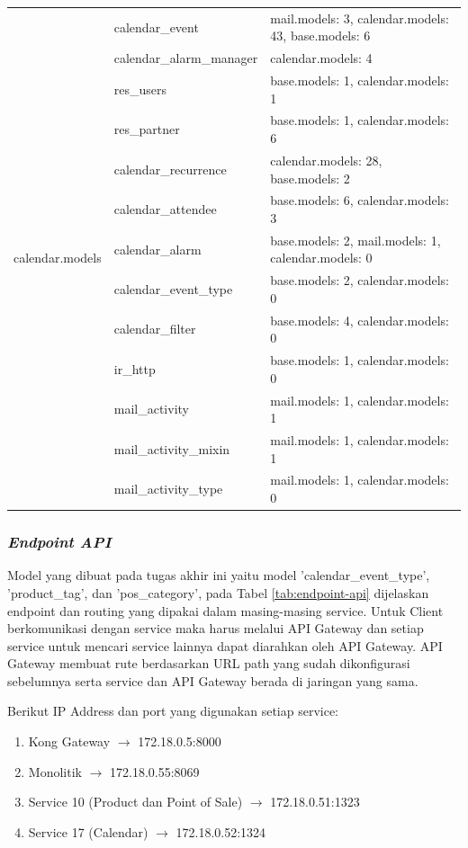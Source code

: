 \begin{longtable}{|c|p{4cm}|p{7cm}|}
	\hline
	\multirow{13}{*}{calendar.models} &  calendar{\_}event &  mail.models: 3, calendar.models: 43, base.models: 6 \\ \cline{2-3}  &  calendar{\_}alarm{\_}manager &  calendar.models: 4 \\ \cline{2-3}  &  res{\_}users &  base.models: 1, calendar.models: 1 \\ \cline{2-3}  &  res{\_}partner &  base.models: 1, calendar.models: 6 \\ \cline{2-3}  &  calendar{\_}recurrence &  calendar.models: 28, base.models: 2 \\ \cline{2-3}  &  calendar{\_}attendee &  base.models: 6, calendar.models: 3 \\ \cline{2-3}  &  calendar{\_}alarm &  base.models: 2, mail.models: 1, calendar.models: 0 \\ \cline{2-3}  &  calendar{\_}event{\_}type &  base.models: 2, calendar.models: 0 \\ \cline{2-3}  &  calendar{\_}filter &  base.models: 4, calendar.models: 0 \\ \cline{2-3}  &  ir{\_}http &  base.models: 1, calendar.models: 0 \\ \cline{2-3}  &  mail{\_}activity &  mail.models: 1, calendar.models: 1 \\ \cline{2-3}  &  mail{\_}activity{\_}mixin &  mail.models: 1, calendar.models: 1 \\ \cline{2-3}  &  mail{\_}activity{\_}type &  mail.models: 1, calendar.models: 0 \\
	\hline
\end{longtable}

\subsubsection{\textit{Endpoint API}}
Model yang dibuat pada tugas akhir ini yaitu model 'calendar\_event\_type', 'product\_tag', dan 'pos\_category', pada Tabel \ref{tab:endpoint-api} dijelaskan endpoint dan routing yang dipakai dalam masing-masing service.   Untuk Client berkomunikasi dengan service maka harus melalui API Gateway dan setiap service untuk mencari service lainnya dapat diarahkan oleh API Gateway. API Gateway membuat rute berdasarkan URL path yang sudah dikonfigurasi sebelumnya serta service dan API Gateway berada di jaringan yang sama.

Berikut IP Address dan port yang digunakan setiap service:
\begin{enumerate}[leftmargin=1.3cm]
	\item Kong Gateway $\rightarrow$ 172.18.0.5:8000
	\item Monolitik $\rightarrow$ 172.18.0.55:8069
	\item Service 10 (Product dan Point of Sale) $\rightarrow$ 172.18.0.51:1323
	\item Service 17 (Calendar) $\rightarrow$ 172.18.0.52:1324
\end{enumerate}

